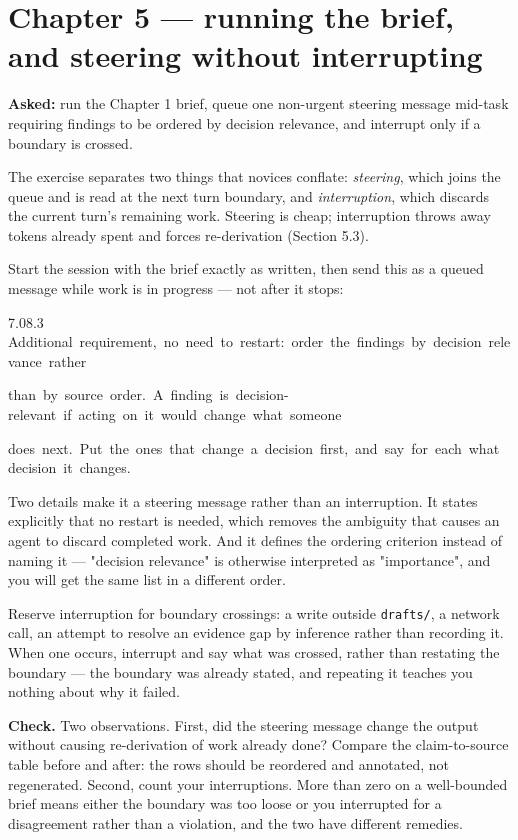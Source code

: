 \documentclass[11pt,a4paper,twoside,openany]{book}
\newcommand{\cl}[1]{\noindent\mbox{#1}\par}
\begin{document}
\FloatBarrier
\section*{Chapter 5 — running the brief, and steering without interrupting}

\textbf{Asked:} run the Chapter 1 brief, queue one non-urgent steering message mid-task requiring findings to be ordered by decision relevance, and interrupt only if a boundary is crossed.


The exercise separates two things that novices conflate: \emph{steering}, which joins the queue and is read at the next turn boundary, and \emph{interruption}, which discards the current turn's remaining work. Steering is cheap; interruption throws away tokens already spent and forces re-derivation (Section 5.3).


Start the session with the brief exactly as written, then send this as a queued message while work is in progress — not after it stops:


\begin{codeblock}{7.0}{8.3}
\cl{Additional~requirement,~no~need~to~restart:~order~the~findings~by~decision~relevance~rather}
\cl{than~by~source~order.~A~finding~is~decision-relevant~if~acting~on~it~would~change~what~someone}
\cl{does~next.~Put~the~ones~that~change~a~decision~first,~and~say~for~each~what~decision~it~changes.}
\end{codeblock}

Two details make it a steering message rather than an interruption. It states explicitly that no restart is needed, which removes the ambiguity that causes an agent to discard completed work. And it defines the ordering criterion instead of naming it — "decision relevance" is otherwise interpreted as "importance", and you will get the same list in a different order.


Reserve interruption for boundary crossings: a write outside \texttt{drafts/\allowbreak{}}, a network call, an attempt to resolve an evidence gap by inference rather than recording it. When one occurs, interrupt and say what was crossed, rather than restating the boundary — the boundary was already stated, and repeating it teaches you nothing about why it failed.


\textbf{Check.} Two observations. First, did the steering message change the output without causing re-derivation of work already done? Compare the claim-to-source table before and after: the rows should be reordered and annotated, not regenerated. Second, count your interruptions. More than zero on a well-bounded brief means either the boundary was too loose or you interrupted for a disagreement rather than a violation, and the two have different remedies.
\end{document}
